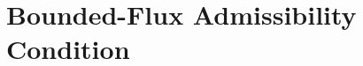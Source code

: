 \section{Bounded-Flux Admissibility Condition}
  \label{sec:bounded-flux-admissibility}

  
  
  
  
  
  
